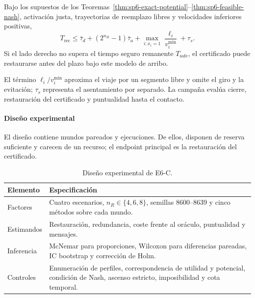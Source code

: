 \begin{corolario}
\label{cor:sp6-time-bound}
Bajo los supuestos de los Teoremas~\ref{thm:sp6-exact-potential}--\ref{thm:sp6-feasible-nash}, activación justa, trayectorias de reemplazo libres y velocidades inferiores positivas,
\begin{equation}
\label{eq:sp6-time-bound}
 T_{\mathrm{rec}}
 \leq \bar\tau_d+(2^{n_R}-1)\bar\tau_a
 +\max_{i:x_i=1}\frac{\ell_i}{v_i^{\min}}+\tau_s.
\end{equation}
Si el lado derecho no supera el tiempo seguro remanente $T_{\mathrm{safe}}$, el certificado puede restaurarse antes del plazo bajo este modelo de arribo.
\end{corolario}

El término $\ell_i/v_i^{\min}$ aproxima el viaje por un segmento libre y omite el giro y la evitación; $\tau_s$ representa el asentamiento por separado. La campaña evalúa cierre, restauración del certificado y puntualidad hasta el contacto.

\paragraph{Diseño experimental}


El diseño contiene \SPSixWorlds{} mundos pareados y \SPSixRuns{} ejecuciones. De ellos, \SPSixRecoverableWorlds{} disponen de reserva suficiente y \SPSixIrrecoverableWorlds{} carecen de un recurso; el endpoint principal es la restauración del certificado.

\begin{table}[!htbp]
  \centering
  \caption{Diseño experimental de E6-C.}
  \label{tab:sp6-design}
  \viutablefont
  \begin{tabularx}{0.94\textwidth}{>{\raggedright\arraybackslash}p{2.4cm} Y}
    \toprule
    Elemento & Especificación \\
    \midrule
    Factores & Cuatro escenarios, $n_R\in\{4,6,8\}$, semillas 8600--8639 y cinco métodos sobre cada mundo. \\
    Estimandos & Restauración, redundancia, coste frente al oráculo, puntualidad y mensajes. \\
    Inferencia & McNemar para proporciones, Wilcoxon para diferencias pareadas, IC \mbox{bootstrap} y corrección de Holm. \\
    Controles & Enumeración de perfiles, correspondencia de utilidad y potencial, condición de Nash, ascenso estricto, imposibilidad y cota temporal. \\
    \bottomrule
  \end{tabularx}
\end{table}

